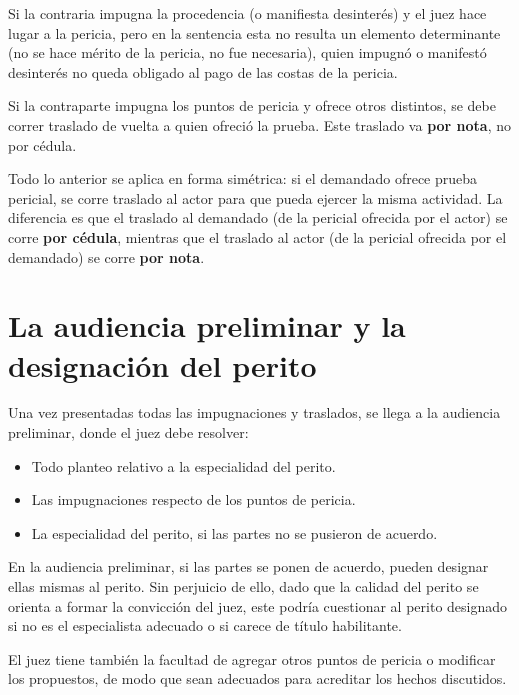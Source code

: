 \documentclass[12pt,oneside]{book}
\begin{document}
Si la contraria impugna la procedencia (o manifiesta desinterés) y el juez hace lugar a la pericia, pero en la sentencia esta no resulta un elemento determinante (no se hace mérito de la pericia, no fue necesaria), quien impugnó o manifestó desinterés no queda obligado al pago de las costas de la pericia.

Si la contraparte impugna los puntos de pericia y ofrece otros distintos, se debe correr traslado de vuelta a quien ofreció la prueba. Este traslado va \textbf{por nota}, no por cédula.

Todo lo anterior se aplica en forma simétrica: si el demandado ofrece prueba pericial, se corre traslado al actor para que pueda ejercer la misma actividad. La diferencia es que el traslado al demandado (de la pericial ofrecida por el actor) se corre \textbf{por cédula}, mientras que el traslado al actor (de la pericial ofrecida por el demandado) se corre \textbf{por nota}.

\section{La audiencia preliminar y la designación del perito}

Una vez presentadas todas las impugnaciones y traslados, se llega a la audiencia preliminar, donde el juez debe resolver:

\begin{itemize}
    \item Todo planteo relativo a la especialidad del perito.
    \item Las impugnaciones respecto de los puntos de pericia.
    \item La especialidad del perito, si las partes no se pusieron de acuerdo.
\end{itemize}

En la audiencia preliminar, si las partes se ponen de acuerdo, pueden designar ellas mismas al perito. Sin perjuicio de ello, dado que la calidad del perito se orienta a formar la convicción del juez, este podría cuestionar al perito designado si no es el especialista adecuado o si carece de título habilitante.

El juez tiene también la facultad de agregar otros puntos de pericia o modificar los propuestos, de modo que sean adecuados para acreditar los hechos discutidos.
\end{document}

